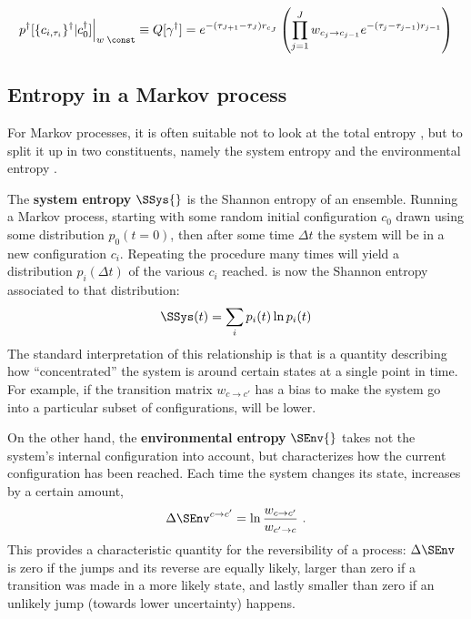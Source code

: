 \begin{equation}
	p^\dagger[\{c_{i,\tau_i}\}^\dagger | c_0^\dagger]\Bigr|_{w\;\const}
	\equiv
	Q[\gamma^\dagger]
	=
	e^{-(\tau_{J+1}-\tau_J)r_{c_J}} \left(
		\prod_{j = 1}^J
		w_{c_j\to c_{j-1}}
		e^{-(\tau_j-\tau_{j-1})r_{j-1}}
		\right)
\end{equation}











\subsection{Entropy in a Markov process}

For Markov processes, it is often suitable not to look at the total entropy \STot{}, but to split it up in two constituents, namely the system entropy \SSys{} and the environmental entropy \SEnv{}.

The \textbf{system entropy} \(\mathbf{\SSys{}}\) is the Shannon entropy of an ensemble. Running a Markov process, starting with some random initial configuration \(c_0\) drawn using some distribution \(p_0(t=0)\), then after some time \(\Delta t\) the system will be in a new configuration \(c_i\). Repeating the procedure many times will yield a distribution \(p_i(\Delta t)\) of the various \(c_i\) reached. \SSys{} is now the Shannon entropy associated to that distribution:
%
\begin{align}
	\SSys(t) = \sum_i p_i(t)\ln p_i(t)
\end{align}
%
The standard interpretation of this relationship is that \SSys{} is a quantity describing how ``concentrated'' the system is around certain states at a single point in time. For example, if the transition matrix \(w_{c\to c'}\) has a bias to make the system go into a particular subset of configurations, \SSys will be lower.

On the other hand, the \textbf{environmental entropy} \(\mathbf{\SEnv{}}\) takes not the system's internal configuration into account, but characterizes how the current configuration has been reached. Each time the system changes its state, \SEnv{} increases by a certain amount,
%
\begin{align}
	\label{eqn:SEnv single jump definition}
	\Delta\SEnv^{c\to c'} = \ln\frac{w_{c\to c'}}{w_{c'\to c}} ~.
\end{align}
%
This provides a characteristic quantity for the reversibility of a process: \(\Delta \SEnv\) is zero if the jumps and its reverse are equally likely, larger than zero if a transition was made in a more likely state, and lastly smaller than zero if an unlikely jump (towards lower uncertainty) happens.

